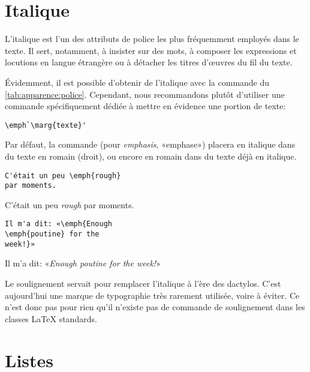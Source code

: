 \section{Italique}

L'italique est l'un des attributs de police les plus fréquemment
employés dans le texte. Il sert, notamment, à insister sur des mots, à
composer les expressions et locutions en langue étrangère ou à
détacher les titres d'{\oe}uvres du fil du texte.

Évidemment, il est possible d'obtenir de l'italique avec la commande
\cmd{\textit} du \autoref{tab:apparence:police}. Cependant, nous
recommandons plutôt d'utiliser une commande spécifiquement dédiée à
mettre en évidence une portion de texte:
\begin{lstlisting}
\emph`\marg{texte}'
\end{lstlisting}
Par défaut, la commande \cmd{\emph} (pour \emph{emphasis}, «emphase»)
placera  en italique dans du texte en romain (droit), ou
encore en romain dans du texte déjà en italique.
\begin{demo}
  \begin{texample}
\begin{lstlisting}
C'était un peu \emph{rough}
par moments.
\end{lstlisting}
    \producing
    C'était un peu \emph{rough} par moments.
  \end{texample}
  \begin{texample}
\begin{lstlisting}
Il m'a dit: «\emph{Enough
\emph{poutine} for the
week!}»
\end{lstlisting}
    \producing
    Il m'a dit: «\emph{Enough \emph{poutine} for the week!}»
  \end{texample}
\end{demo}

\begin{conseil}
  Le soulignement servait pour remplacer
  l'italique à l'ère des dactylos. C'est aujourd'hui une marque de
  typographie très rarement utilisée, voire à éviter. Ce n'est donc
  pas pour rien qu'il n'existe pas de commande de soulignement dans
  les classes {\LaTeX} standards.
\end{conseil}


\section{Listes}
\label{sec:apparence:listes}

